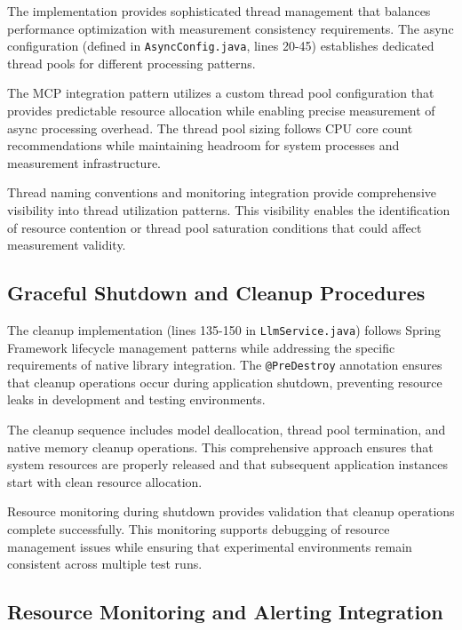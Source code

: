 The implementation provides sophisticated thread management that balances performance optimization with measurement consistency requirements. The async configuration (defined in \texttt{AsyncConfig.java}, lines 20-45) establishes dedicated thread pools for different processing patterns.


The MCP integration pattern utilizes a custom thread pool configuration that provides predictable resource allocation while enabling precise measurement of async processing overhead. The thread pool sizing follows CPU core count recommendations while maintaining headroom for system processes and measurement infrastructure.

Thread naming conventions and monitoring integration provide comprehensive visibility into thread utilization patterns. This visibility enables the identification of resource contention or thread pool saturation conditions that could affect measurement validity.

\subsection{Graceful Shutdown and Cleanup Procedures}

The cleanup implementation (lines 135-150 in \texttt{LlmService.java}) follows Spring Framework lifecycle management patterns while addressing the specific requirements of native library integration. The \texttt{@PreDestroy} annotation ensures that cleanup operations occur during application shutdown, preventing resource leaks in development and testing environments.


The cleanup sequence includes model deallocation, thread pool termination, and native memory cleanup operations. This comprehensive approach ensures that system resources are properly released and that subsequent application instances start with clean resource allocation.

Resource monitoring during shutdown provides validation that cleanup operations complete successfully. This monitoring supports debugging of resource management issues while ensuring that experimental environments remain consistent across multiple test runs.

\subsection{Resource Monitoring and Alerting Integration}

